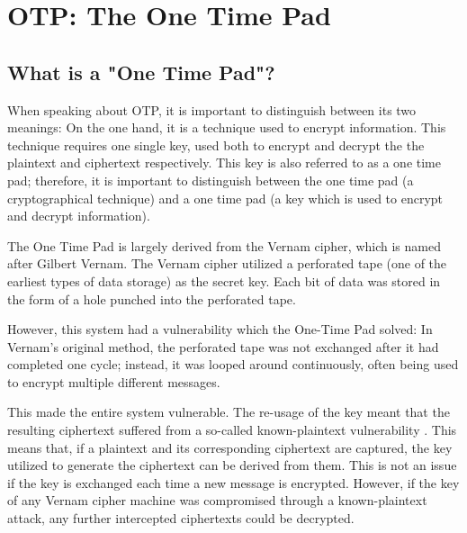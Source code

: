 \documentclass[12pt, a4paper]{report}
\theoremstyle{definition}
\theoremstyle{remark}
\begin{document}
\tableofcontents

\chapter{OTP: The One Time Pad}

\section{What is a "One Time Pad"?}
When speaking about OTP, it is important to distinguish between its two meanings: On the one hand, it is a technique used to encrypt information. This technique requires one single key, used both to encrypt and decrypt the the plaintext and ciphertext respectively. This key is also referred to as a one time pad; therefore, it is important to distinguish between the one time pad (a cryptographical technique) and a one time pad (a key which is used to encrypt and decrypt information).

The One Time Pad is largely derived from the Vernam cipher, which is named after Gilbert Vernam. The Vernam cipher utilized a perforated tape (one of the earliest types of data storage) as the secret key\cite{VernamPatent}. Each bit of data was stored in the form of a hole punched into the perforated tape.


However, this system had a vulnerability which the One-Time Pad solved: In Vernam's original method, the perforated tape was not exchanged after it had completed one cycle; instead, it was looped around continuously, often being used to encrypt multiple different messages.

This made the entire system vulnerable. The re-usage of the key meant that the resulting ciphertext suffered from a so-called known-plaintext vulnerability \cite{HutSix}. This means that, if a plaintext and its corresponding ciphertext are captured, the key utilized to generate the ciphertext can be derived from them. This is not an issue if the key is exchanged each time a new message is encrypted. However, if the key of any Vernam cipher machine was compromised through a known-plaintext attack, any further intercepted ciphertexts could be decrypted.

\end{document}
